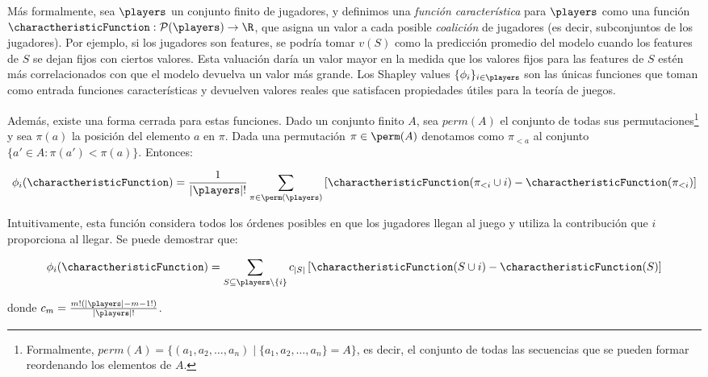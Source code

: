 Más formalmente, sea $\players$ un conjunto finito de jugadores, y definimos una \textit{función característica} para $\players$ como una función $\charactheristicFunction : \mathcal{P}(\players) \to \R$, que asigna un valor a cada posible \textit{coalición} de jugadores (es decir, subconjuntos de los jugadores). Por ejemplo, si los jugadores son features, se podría tomar $v(S)$ como la predicción promedio del modelo cuando los features de $S$ se dejan fijos con ciertos valores. Esta valuación daría un valor mayor en la medida que los valores fijos para las features de $S$ estén más correlacionados con que el modelo devuelva un valor más grande. Los Shapley values $\{\phi_i\}_{i \in \players}$ son las únicas funciones que toman como entrada funciones características y devuelven valores reales que satisfacen propiedades útiles para la teoría de juegos.

Además, existe una forma cerrada para estas funciones. Dado un conjunto finito $A$, sea $perm(A)$ el conjunto de todas sus permutaciones\footnote{Formalmente, $perm(A) = \{(a_1, a_2, \dots, a_n) \mid \{a_1, a_2, \dots, a_n\} = A\}$, es decir, el conjunto de todas las secuencias que se pueden formar reordenando los elementos de $A$.} y sea $\pi(a)$ la posición del elemento $a$ en $\pi$. Dada una permutación $\pi \in \perm(A)$ denotamos como $\pi_{<a}$ al conjunto $\{a' \in A : \pi(a') < \pi(a)\}$. Entonces:

\begin{align}\label{eq:shapley_values_by_perm}
	\phi_i(\charactheristicFunction) = \frac{1}{|\players|!} \sum_{\pi \in \perm(\players)} \left[\charactheristicFunction(\pi_{<i} \cup {i}) - \charactheristicFunction(\pi_{<i})\right]
\end{align}

Intuitivamente, esta función considera todos los órdenes posibles en que los jugadores llegan al juego y utiliza la contribución que $i$ proporciona al llegar. Se puede demostrar que:

\begin{align*}
	\phi_i(\charactheristicFunction) = \sum_{S \subseteq \players \setminus \{i\}} c_{|S|}\left[\charactheristicFunction(S \cup {i}) - \charactheristicFunction(S)\right]
\end{align*}

donde $c_m = \frac{m! (|\players|-m-1!)}{|\players|!}$.\\

